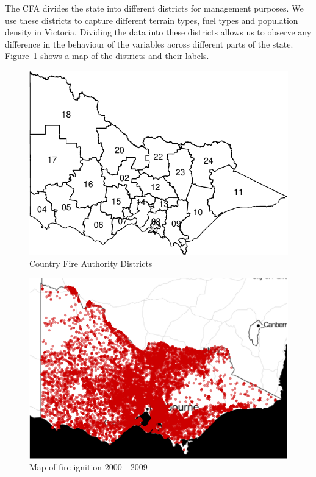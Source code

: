 \documentclass[11pt,a4paper]{article}
\begin{document}
The CFA divides the state into different districts for management purposes. We use these districts to capture different terrain types, fuel types and population density in Victoria. Dividing the data into these districts allows us to observe any difference in the behaviour of the variables across different parts of the state. Figure~\ref{fig:dist} shows a map of the districts and their labels.

\begin{figure}
  \centering
  \includegraphics[width=.7\textwidth]{figures/cfadis.pdf}
  \caption{Country Fire Authority Districts}
  \label{fig:dist}
\end{figure}



\begin{figure}
  \centering
  \includegraphics[width=.8\textwidth]{figures/firemap.pdf}
  \caption{Map of fire ignition 2000 - 2009}
  \label{fig:firemap}
\end{figure}
\end{document}
